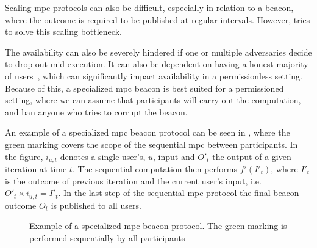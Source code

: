 Scaling \gls{mpc} protocols can also be difficult, especially in relation to a beacon, where the outcome is required to be published at regular intervals.
However,  tries to solve this scaling bottleneck.

The availability can also be severely hindered if one or multiple adversaries decide to drop out mid-execution.
It can also be dependent on having a honest majority of users~\cite{cascudo2017scrape}, which can significantly impact availability in a permissionless setting.
Because of this, a specialized \gls{mpc} beacon is best suited for a permissioned setting, where we can assume that participants will carry out the computation, and ban anyone who tries to corrupt the beacon.

An example of a specialized \gls{mpc} beacon protocol can be seen in , where the green marking covers the scope of the sequential \gls{mpc} between participants.
In the figure, $i_{u,t}$ denotes a single user's, $u$, input and $O'_t$ the output of a given iteration at time $t$.
The sequential computation then performs $f'(I'_t)$, where $I'_t$ is the outcome of previous iteration and the current user's input, i.e.\ $O'_t \times i_{u,t} = I'_t$.
In the last step of the sequential \gls{mpc} protocol the final beacon outcome $O_t$ is published to all users.

\begin{figure}[hbt]
    \centering
    \footnotesize
    \caption{Example of a specialized \gls{mpc} beacon protocol. The green marking is performed sequentially by all participants}\label{fig:mpc_beacon}
\end{figure}


